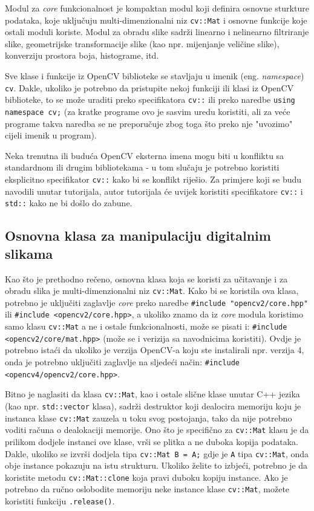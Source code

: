 \documentclass[a4paper, 12pt]{article}
\begin{document}
Modul za \textit{core} funkcionalnost je kompaktan modul koji definira osnovne sturkture podataka, koje uključuju multi-dimenzionalni niz \lstinline{cv::Mat} i osnovne funkcije koje ostali moduli koriste. Modul za obradu slike sadrži linearno i nelinearno filtriranje slike, geometrijske transformacije slike (kao npr. mijenjanje veličine slike), konverziju prostora boja, histograme, itd.

Sve klase i funkcije iz OpenCV biblioteke se stavljaju u imenik (eng. \textit{namespace}) \lstinline{cv}. Dakle, ukoliko je potrebno da pristupite nekoj funkciji ili klasi iz OpenCV biblioteke, to se može uraditi preko specifikatora \lstinline{cv::} ili preko naredbe \lstinline{using namespace cv;} (za kratke programe ovo je sasvim uredu koristiti, ali za veće programe takva naredba se ne preporučuje zbog toga što preko nje "uvozimo" cijeli imenik u program\cite{juricTPpredavanje1}).

Neka trenutna ili buduća OpenCV eksterna imena mogu biti u konfliktu sa standardnom ili drugim bibliotekama - u tom slučaju je potrebno koristiti eksplicitno specifikator \lstinline{cv::} kako bi se konflikt riješio. Za primjere koji se budu navodili unutar tutorijala, autor tutorijala će uvijek koristiti specifikatore \lstinline{cv::} i \lstinline{std::} kako ne bi došlo do zabune.

\subsection*{Osnovna klasa za manipulaciju digitalnim slikama}

Kao što je prethodno rečeno, osnovna klasa koja se koristi za učitavanje i za obradu slika je multi-dimenzionalni niz \lstinline{cv::Mat}. Kako bi se koristila ova klasa, potrebno je uključiti zaglavlje \textit{core} preko naredbe \lstinline{#include "opencv2/core.hpp"} ili \lstinline{#include <opencv2/core.hpp>}, a ukoliko znamo da iz \textit{core} modula koristimo samo klasu \lstinline{cv::Mat} a ne i ostale funkcionalnosti, može se pisati i: \lstinline{#include <opencv2/core/mat.hpp>} (može se i verizija sa navodnicima koristiti). Ovdje je potrebno istaći da ukoliko je verzija OpenCV-a koju ste instalirali npr. verzija 4, onda je potrebno uključiti zaglavlje na sljedeći način: \lstinline{#include <opencv4/opencv2/core.hpp>}.

Bitno je naglasiti da klasa \lstinline{cv::Mat}, kao i ostale slične klase unutar C++ jezika (kao npr. \lstinline{std::vector} klasa), sadrži destruktor koji dealocira memoriju koju je instanca klase \lstinline{cv::Mat} zauzela u toku svog postojanja, tako da nije potrebno voditi računa o dealokaciji memorije. Ono što je specifično za \lstinline{cv::Mat} klasu je da prilikom dodjele instanci ove klase, vrši se plitka a ne duboka kopija podataka. Dakle, ukoliko se izvrši dodjela tipa \lstinline{cv::Mat B = A;} gdje je \lstinline{A} tipa \lstinline{cv::Mat}, onda obje instance pokazuju na istu strukturu. Ukoliko želite to izbjeći, potrebno je da koristite metodu \lstinline{cv::Mat::clone} koja pravi duboku kopiju instance. Ako je potrebno da ručno oslobodite memoriju neke instance klase \lstinline{cv::Mat}, možete koristiti funkciju \lstinline{.release()}.
\end{document}
